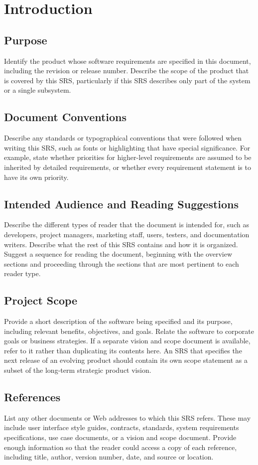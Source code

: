 \documentclass[12pt,oneside,letterpaper]{article}
\begin{document}
\newpage

\section{Introduction}
\subsection{Purpose}
Identify the product whose software requirements are specified in this document, including the revision or release number. Describe the scope of the product that is covered by this SRS, particularly if this SRS describes only part of the system or a single subsystem.
\subsection{Document Conventions}
Describe any standards or typographical conventions that were followed when writing this SRS, such as fonts or highlighting that have special significance. For example, state whether priorities  for higher-level requirements are assumed to be inherited by detailed requirements, or whether every requirement statement is to have its own priority.
\subsection{Intended Audience and Reading Suggestions}
Describe the different types of reader that the document is intended for, such as developers, project managers, marketing staff, users, testers, and documentation writers. Describe what the rest of this SRS contains and how it is organized. Suggest a sequence for reading the document, beginning with the overview sections and proceeding through the sections that are most pertinent to each reader type.
\subsection{Project Scope}
Provide a short description of the software being specified and its purpose, including relevant benefits, objectives, and goals. Relate the software to corporate goals or business strategies. If a separate vision and scope document is available, refer to it rather than duplicating its contents here. An SRS that specifies the next release of an evolving product should contain its own scope statement as a subset of the long-term strategic product vision.
\subsection{References}
List any other documents or Web addresses to which this SRS refers. These may include user interface style guides, contracts, standards, system requirements specifications, use case documents, or a vision and scope document. Provide enough information so that the reader could access a copy of each reference, including title, author, version number, date, and source or location.
\end{document}
